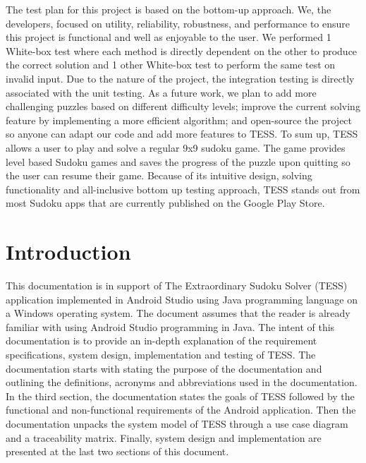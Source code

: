 \documentclass{article}
\begin{document}
The test plan for this project is based on the bottom-up approach. We, the developers, focused on utility, reliability, robustness, and performance to ensure this project is functional and well as enjoyable to the user. We performed 1 White-box test where each method is directly dependent on the other to produce the correct solution and 1 other White-box test to perform the same test on invalid input. Due to the nature of the project, the integration testing is directly associated with the unit testing. \newline \newline
As a future work, we plan to add more challenging puzzles based on different difficulty levels; improve the current solving feature by implementing a more efficient algorithm; and open-source the project so anyone can adapt our code and add more features to TESS. \newline \newline
To sum up, TESS allows a user to play and solve a regular 9x9 sudoku game. The game provides level based Sudoku games and saves the progress of the puzzle upon quitting so the user can resume their game. Because of its intuitive design, solving functionality and all-inclusive bottom up testing approach, TESS stands out from most Sudoku apps that are currently published on the Google Play Store. 


 
\section{Introduction}
This documentation is in support of The Extraordinary Sudoku Solver (TESS) application implemented in Android Studio using Java programming language on a Windows operating system. The document assumes that the reader is already familiar with using Android Studio programming in Java. The intent of this documentation is to provide an in-depth explanation of the requirement specifications, system design, implementation and testing of TESS. \newline \newline
The documentation starts with stating the purpose of the documentation and outlining the definitions, acronyms and abbreviations used in the documentation. In the third section, the documentation states the goals of TESS followed by the functional and non-functional requirements of the Android application. Then the documentation unpacks the system model of TESS through a use case diagram and a traceability matrix. Finally, system design and implementation are presented at the last two sections of this document. 
\end{document}
